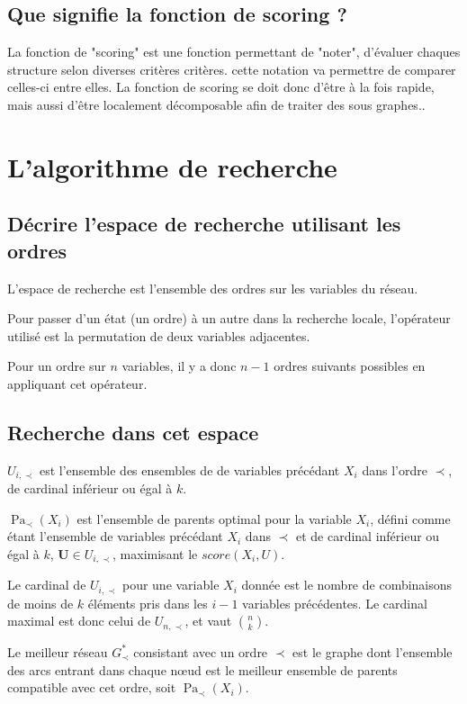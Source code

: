 \documentclass[french,a4paper]{article}
\DeclareMathOperator{\Pa}{Pa}
\begin{document}
\subsection{Que signifie la fonction de scoring ?}
La fonction de "scoring" est une fonction permettant de "noter", d'évaluer
 chaques structure selon diverses critères critères. cette notation va permettre
 de comparer celles-ci entre elles.
La fonction de scoring se doit donc d'être à la fois rapide, mais aussi d'être
localement décomposable afin de traiter des sous graphes..

\section{L'algorithme de recherche}
\subsection{Décrire l'espace de recherche utilisant les ordres}
L'espace de recherche est l'ensemble des ordres sur les variables du
réseau.

Pour passer d'un état (un ordre) à un autre dans la recherche locale,
l'opérateur utilisé est la permutation de deux variables adjacentes.

Pour un ordre sur $n$ variables, il y a donc $n-1$ ordres suivants
possibles en appliquant cet opérateur.

\subsection{Recherche dans cet espace}

$U_{i,\prec}$ est l'ensemble des ensembles de de variables précédant
$X_i$ dans l'ordre $\prec$, de cardinal inférieur ou égal à $k$.

$\Pa_\prec(X_i)$ est l'ensemble de parents optimal pour la variable
$X_i$, défini comme étant l'ensemble de variables précédant $X_i$ dans
$\prec$ et de cardinal inférieur ou égal à $k$, $\mathbf{U} \in
U_{i,\prec}$, maximisant le $score(X_i, U)$.

Le cardinal de $U_{i,\prec}$ pour une variable $X_i$ donnée est le
nombre de combinaisons de moins de $k$ éléments pris dans les $i-1$
variables précédentes. Le cardinal maximal est donc celui de
$U_{n,\prec}$, et vaut $\binom{n}{k}$.

Le meilleur réseau $G^*_\prec$ consistant avec un ordre $\prec$ est le
graphe dont l'ensemble des arcs entrant dans chaque nœud est le
meilleur ensemble de parents compatible avec cet ordre, soit
$\Pa_\prec(X_i)$.
\end{document}
